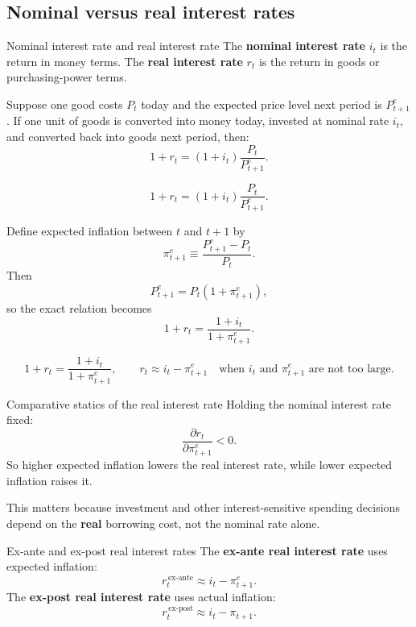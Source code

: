 \subsection{Nominal versus real interest rates}

\begin{definition}{Nominal interest rate and real interest rate}{}
The \textbf{nominal interest rate} $i_t$ is the return in money terms.  
The \textbf{real interest rate} $r_t$ is the return in goods or purchasing-power terms.
\end{definition}

\noindent
Suppose one good costs $P_t$ today and the expected price level next period is $P_{t+1}^e$. If one unit of goods is converted into money today, invested at nominal rate $i_t$, and converted back into goods next period, then:
\[
1+r_t = (1+i_t)\frac{P_t}{P_{t+1}^e}.
\]

\begin{keyformula}[title={Key Formula: Exact relation between nominal and real interest rates}]
\[
1+r_t = (1+i_t)\frac{P_t}{P_{t+1}^e}.
\]
\end{keyformula}

\noindent
Define expected inflation between $t$ and $t+1$ by
\[
\pi_{t+1}^e \equiv \frac{P_{t+1}^e-P_t}{P_t}.
\]
Then
\[
P_{t+1}^e = P_t(1+\pi_{t+1}^e),
\]
so the exact relation becomes
\[
1+r_t = \frac{1+i_t}{1+\pi_{t+1}^e}.
\]

\begin{keyformula}[title={Key Formula: Fisher relation (exact and approximate)}]
\[
1+r_t = \frac{1+i_t}{1+\pi_{t+1}^e},
\qquad
r_t \approx i_t - \pi_{t+1}^e
\quad
\text{when } i_t \text{ and } \pi_{t+1}^e \text{ are not too large.}
\]
\end{keyformula}

\begin{theorem}{Comparative statics of the real interest rate}{}
Holding the nominal interest rate fixed:
\[
\frac{\partial r_t}{\partial \pi_{t+1}^e}<0.
\]
So higher expected inflation lowers the real interest rate, while lower expected inflation raises it.
\end{theorem}

\noindent
This matters because investment and other interest-sensitive spending decisions depend on the \textbf{real} borrowing cost, not the nominal rate alone.

\begin{definition}{Ex-ante and ex-post real interest rates}{}
The \textbf{ex-ante real interest rate} uses expected inflation:
\[
r_t^{\,\text{ex-ante}} \approx i_t-\pi_{t+1}^e.
\]
The \textbf{ex-post real interest rate} uses actual inflation:
\[
r_t^{\,\text{ex-post}} \approx i_t-\pi_{t+1}.
\]
\end{definition}

